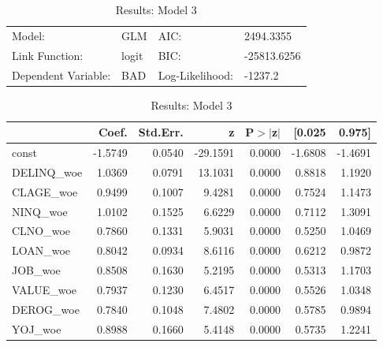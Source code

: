 \begin{table}[H]
\renewcommand{\arraystretch}{1.25}
\begin{center}
\begin{tabular}{llll}
\hline
Model:              & GLM              & AIC:            & 2494.3355    \\
Link Function:      & logit            & BIC:            & -25813.6256  \\
Dependent Variable: & BAD              & Log-Likelihood: & -1237.2      \\
\hline
\end{tabular}
\end{center}
\begin{center}
\begin{tabular}{lrrrrrr}
\hline
            &  Coef.  & Std.Err. &    z     & P$> |$z$|$ &  [0.025 &  0.975]  \\
\hline
\hline
const       & -1.5749 &   0.0540 & -29.1591 &      0.0000 & -1.6808 & -1.4691  \\
DELINQ\_woe &  1.0369 &   0.0791 &  13.1031 &      0.0000 &  0.8818 &  1.1920  \\
CLAGE\_woe  &  0.9499 &   0.1007 &   9.4281 &      0.0000 &  0.7524 &  1.1473  \\
NINQ\_woe   &  1.0102 &   0.1525 &   6.6229 &      0.0000 &  0.7112 &  1.3091  \\
CLNO\_woe   &  0.7860 &   0.1331 &   5.9031 &      0.0000 &  0.5250 &  1.0469  \\
LOAN\_woe   &  0.8042 &   0.0934 &   8.6116 &      0.0000 &  0.6212 &  0.9872  \\
JOB\_woe    &  0.8508 &   0.1630 &   5.2195 &      0.0000 &  0.5313 &  1.1703  \\
VALUE\_woe  &  0.7937 &   0.1230 &   6.4517 &      0.0000 &  0.5526 &  1.0348  \\
DEROG\_woe  &  0.7840 &   0.1048 &   7.4802 &      0.0000 &  0.5785 &  0.9894  \\
YOJ\_woe    &  0.8988 &   0.1660 &   5.4148 &      0.0000 &  0.5735 &  1.2241  \\
\hline
\end{tabular}
\end{center}
\caption{Results: Model 3 \label{table:results_3}}
\end{table}

\pagebreak

